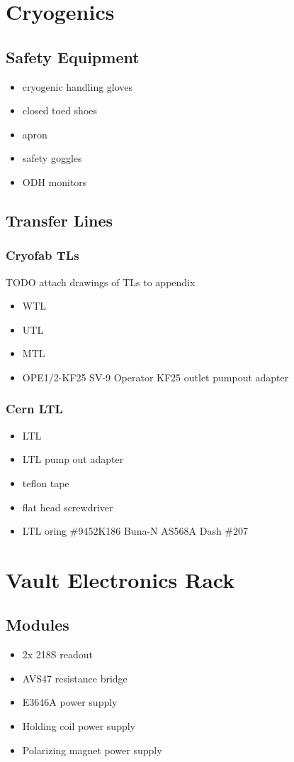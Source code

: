 \section{Cryogenics}
  \subsection{Safety Equipment}
\begin{itemize}
 \item cryogenic handling gloves
\item closed toed shoes
\item apron
\item safety goggles
\item ODH monitors
\end{itemize}

  \subsection{Transfer Lines}
\subsubsection{Cryofab TLs}
TODO attach drawings of TLs to appendix
\begin{itemize}
\item WTL
\item UTL
\item MTL
\item {} OPE1/2-KF25 SV-9 Operator KF25 outlet pumpout adapter
\end{itemize}

\subsubsection{Cern LTL}
\begin{itemize}
\item LTL
\item LTL pump out adapter
\item teflon tape
\item flat head screwdriver
\item LTL oring  \#9452K186 Buna-N AS568A Dash \#207
\end{itemize}


\section{Vault Electronics Rack}
\subsection{Modules}
\begin{itemize}
 \item 2x  218S readout
\item AVS47 resistance bridge
\item {} E3646A power supply
\item Holding coil power supply
\item Polarizing magnet power supply
\end{itemize}

